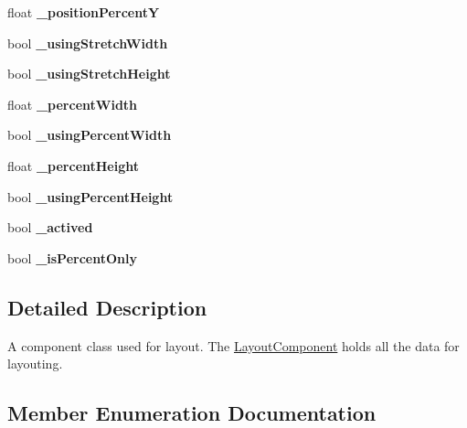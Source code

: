 \begin{DoxyCompactItemize}
\mbox{\label{classui_1_1LayoutComponent_af1fe4e9cdb229a2c31b03e2bb0a9ca49}} 
float {\bfseries \+\_\+position\+PercentY}
\item 
\mbox{\label{classui_1_1LayoutComponent_a0d66606ad6e3a9bdb22dd635ea76dd6b}} 
bool {\bfseries \+\_\+using\+Stretch\+Width}
\item 
\mbox{\label{classui_1_1LayoutComponent_aaeab34c29cb7e5dce538cf988085e28c}} 
bool {\bfseries \+\_\+using\+Stretch\+Height}
\item 
\mbox{\label{classui_1_1LayoutComponent_a77303cbf57acb409e5a6924868674765}} 
float {\bfseries \+\_\+percent\+Width}
\item 
\mbox{\label{classui_1_1LayoutComponent_aa6212326b2aec5e0255ceff6fd10c185}} 
bool {\bfseries \+\_\+using\+Percent\+Width}
\item 
\mbox{\label{classui_1_1LayoutComponent_a1bc05efc54357d0e741f96615cfb2a32}} 
float {\bfseries \+\_\+percent\+Height}
\item 
\mbox{\label{classui_1_1LayoutComponent_acd1a6da7d9119acef9a658343fa2b948}} 
bool {\bfseries \+\_\+using\+Percent\+Height}
\item 
\mbox{\label{classui_1_1LayoutComponent_a7502f8c12f55a83ce531cdc25561429c}} 
bool {\bfseries \+\_\+actived}
\item 
\mbox{\label{classui_1_1LayoutComponent_a6514926b15e82a317b1b809b3f859e8c}} 
bool {\bfseries \+\_\+is\+Percent\+Only}
\end{DoxyCompactItemize}


\subsection{Detailed Description}
A component class used for layout. The \hyperlink{classui_1_1LayoutComponent}{Layout\+Component} holds all the data for layouting. 

\subsection{Member Enumeration Documentation}
\mbox{\label{classui_1_1LayoutComponent_aaa61687a8a4e98f525413e1f0cfacf18}} 
